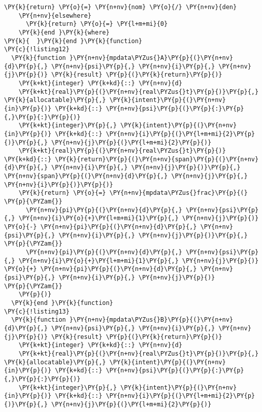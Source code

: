 \begin{Verbatim}[commandchars=\\\{\}]
      \PY{k}{return} \PY{o}{=} \PY{n+nv}{nom} \PY{o}{/} \PY{n+nv}{den}
    \PY{n+nv}{elsewhere}
      \PY{k}{return} \PY{o}{=} \PY{l+m+mi}{0}
    \PY{k}{end }\PY{k}{where}
\PY{k}{  }\PY{k}{end }\PY{k}{function}
\PY{c}{!listing12}
  \PY{k}{function }\PY{n+nv}{mpdata\PYZus{}A}\PY{p}{(}\PY{n+nv}{d}\PY{p}{,} \PY{n+nv}{psi}\PY{p}{,} \PY{n+nv}{i}\PY{p}{,} \PY{n+nv}{j}\PY{p}{)} \PY{k}{result} \PY{p}{(}\PY{k}{return}\PY{p}{)}
    \PY{k+kt}{integer} \PY{k+kd}{::} \PY{n+nv}{d}
    \PY{k+kt}{real}\PY{p}{(}\PY{n+nv}{real\PYZus{}t}\PY{p}{)}\PY{p}{,} \PY{k}{allocatable}\PY{p}{,} \PY{k}{intent}\PY{p}{(}\PY{n+nv}{in}\PY{p}{)} \PY{k+kd}{::} \PY{n+nv}{psi}\PY{p}{(}\PY{p}{:}\PY{p}{,}\PY{p}{:}\PY{p}{)}
    \PY{k+kt}{integer}\PY{p}{,} \PY{k}{intent}\PY{p}{(}\PY{n+nv}{in}\PY{p}{)} \PY{k+kd}{::} \PY{n+nv}{i}\PY{p}{(}\PY{l+m+mi}{2}\PY{p}{)}\PY{p}{,} \PY{n+nv}{j}\PY{p}{(}\PY{l+m+mi}{2}\PY{p}{)}
    \PY{k+kt}{real}\PY{p}{(}\PY{n+nv}{real\PYZus{}t}\PY{p}{)} \PY{k+kd}{::} \PY{k}{return}\PY{p}{(}\PY{n+nv}{span}\PY{p}{(}\PY{n+nv}{d}\PY{p}{,} \PY{n+nv}{i}\PY{p}{,} \PY{n+nv}{j}\PY{p}{)}\PY{p}{,} \PY{n+nv}{span}\PY{p}{(}\PY{n+nv}{d}\PY{p}{,} \PY{n+nv}{j}\PY{p}{,} \PY{n+nv}{i}\PY{p}{)}\PY{p}{)}
    \PY{k}{return} \PY{o}{=} \PY{n+nv}{mpdata\PYZus{}frac}\PY{p}{(}                              \PY{p}{\PYZam{}}
      \PY{n+nv}{pi}\PY{p}{(}\PY{n+nv}{d}\PY{p}{,} \PY{n+nv}{psi}\PY{p}{,} \PY{n+nv}{i}\PY{o}{+}\PY{l+m+mi}{1}\PY{p}{,} \PY{n+nv}{j}\PY{p}{)} \PY{o}{-} \PY{n+nv}{pi}\PY{p}{(}\PY{n+nv}{d}\PY{p}{,} \PY{n+nv}{psi}\PY{p}{,} \PY{n+nv}{i}\PY{p}{,} \PY{n+nv}{j}\PY{p}{)}\PY{p}{,}           \PY{p}{\PYZam{}}
      \PY{n+nv}{pi}\PY{p}{(}\PY{n+nv}{d}\PY{p}{,} \PY{n+nv}{psi}\PY{p}{,} \PY{n+nv}{i}\PY{o}{+}\PY{l+m+mi}{1}\PY{p}{,} \PY{n+nv}{j}\PY{p}{)} \PY{o}{+} \PY{n+nv}{pi}\PY{p}{(}\PY{n+nv}{d}\PY{p}{,} \PY{n+nv}{psi}\PY{p}{,} \PY{n+nv}{i}\PY{p}{,} \PY{n+nv}{j}\PY{p}{)}            \PY{p}{\PYZam{}}
    \PY{p}{)}  
  \PY{k}{end }\PY{k}{function}
\PY{c}{!listing13}
  \PY{k}{function }\PY{n+nv}{mpdata\PYZus{}B}\PY{p}{(}\PY{n+nv}{d}\PY{p}{,} \PY{n+nv}{psi}\PY{p}{,} \PY{n+nv}{i}\PY{p}{,} \PY{n+nv}{j}\PY{p}{)} \PY{k}{result} \PY{p}{(}\PY{k}{return}\PY{p}{)}
    \PY{k+kt}{integer} \PY{k+kd}{::} \PY{n+nv}{d}
    \PY{k+kt}{real}\PY{p}{(}\PY{n+nv}{real\PYZus{}t}\PY{p}{)}\PY{p}{,} \PY{k}{allocatable}\PY{p}{,} \PY{k}{intent}\PY{p}{(}\PY{n+nv}{in}\PY{p}{)} \PY{k+kd}{::} \PY{n+nv}{psi}\PY{p}{(}\PY{p}{:}\PY{p}{,}\PY{p}{:}\PY{p}{)} 
    \PY{k+kt}{integer}\PY{p}{,} \PY{k}{intent}\PY{p}{(}\PY{n+nv}{in}\PY{p}{)} \PY{k+kd}{::} \PY{n+nv}{i}\PY{p}{(}\PY{l+m+mi}{2}\PY{p}{)}\PY{p}{,} \PY{n+nv}{j}\PY{p}{(}\PY{l+m+mi}{2}\PY{p}{)}

\end{Verbatim}
